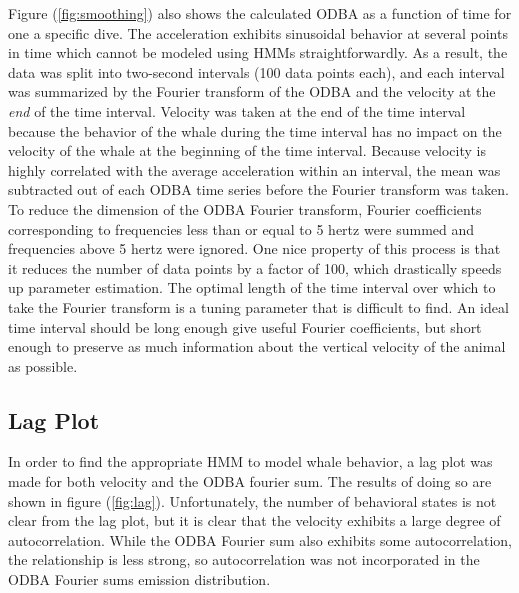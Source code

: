 Figure (\ref{fig:smoothing}) also shows the calculated ODBA as a function of time for one a specific dive. The acceleration exhibits sinusoidal behavior at several points in time which cannot be modeled using HMMs straightforwardly. As a result, the data was split into two-second intervals (100 data points each), and each interval was summarized by the Fourier transform of the ODBA and the velocity at the \textit{end} of the time interval. Velocity was taken at the end of the time interval because the behavior of the whale during the time interval has no impact on the velocity of the whale at the beginning of the time interval. Because velocity is highly correlated with the average acceleration within an interval, the mean was subtracted out of each ODBA time series before the Fourier transform was taken. To reduce the dimension of the ODBA Fourier transform, Fourier coefficients corresponding to frequencies less than or equal to 5 hertz were summed and frequencies above 5 hertz were ignored. One nice property of this process is that it reduces the number of data points by a factor of 100, which drastically speeds up parameter estimation. The optimal length of the time interval over which to take the Fourier transform is a tuning parameter that is difficult to find. An ideal time interval should be long enough give useful Fourier coefficients, but short enough to preserve as much information about the vertical velocity of the animal as possible.

\subsection{Lag Plot}

In order to find the appropriate HMM to model whale behavior, a lag plot was made for both velocity and the ODBA fourier sum. The results of doing so are shown in figure (\ref{fig:lag}). Unfortunately, the number of behavioral states is not clear from the lag plot, but it is clear that the velocity exhibits a large degree of autocorrelation. While the ODBA Fourier sum also exhibits some autocorrelation, the relationship is less strong, so autocorrelation was not incorporated in the ODBA Fourier sums emission distribution.

